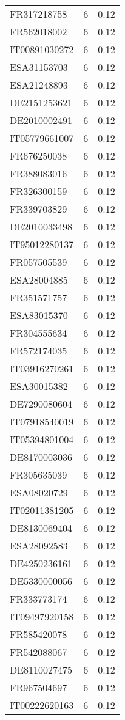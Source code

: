 \begin{table*}[htbp]
\begin{tabular}{lrr}
FR317218758 & 6 & 0.12 \\
FR562018002 & 6 & 0.12 \\
IT00891030272 & 6 & 0.12 \\
ESA31153703 & 6 & 0.12 \\
ESA21248893 & 6 & 0.12 \\
DE2151253621 & 6 & 0.12 \\
DE2010002491 & 6 & 0.12 \\
IT05779661007 & 6 & 0.12 \\
FR676250038 & 6 & 0.12 \\
FR388083016 & 6 & 0.12 \\
FR326300159 & 6 & 0.12 \\
FR339703829 & 6 & 0.12 \\
DE2010033498 & 6 & 0.12 \\
IT95012280137 & 6 & 0.12 \\
FR057505539 & 6 & 0.12 \\
ESA28004885 & 6 & 0.12 \\
FR351571757 & 6 & 0.12 \\
ESA83015370 & 6 & 0.12 \\
FR304555634 & 6 & 0.12 \\
FR572174035 & 6 & 0.12 \\
IT03916270261 & 6 & 0.12 \\
ESA30015382 & 6 & 0.12 \\
DE7290080604 & 6 & 0.12 \\
IT07918540019 & 6 & 0.12 \\
IT05394801004 & 6 & 0.12 \\
DE8170003036 & 6 & 0.12 \\
FR305635039 & 6 & 0.12 \\
ESA08020729 & 6 & 0.12 \\
IT02011381205 & 6 & 0.12 \\
DE8130069404 & 6 & 0.12 \\
ESA28092583 & 6 & 0.12 \\
DE4250236161 & 6 & 0.12 \\
DE5330000056 & 6 & 0.12 \\
FR333773174 & 6 & 0.12 \\
IT09497920158 & 6 & 0.12 \\
FR585420078 & 6 & 0.12 \\
FR542088067 & 6 & 0.12 \\
DE8110027475 & 6 & 0.12 \\
FR967504697 & 6 & 0.12 \\
IT00222620163 & 6 & 0.12 \\

\end{tabular}
\end{table*}
